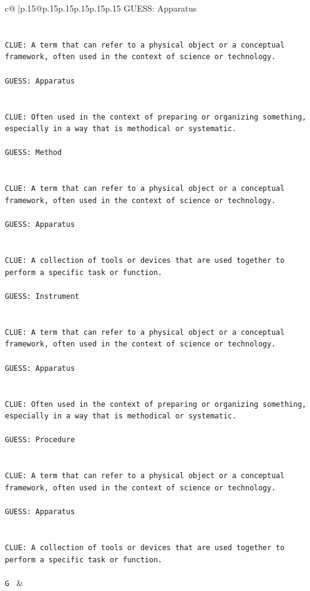 \documentclass{article}
\begin{document}
{\begin{supertabular}{c@{$\;$}|p{.15\linewidth}@{}p{.15\linewidth}p{.15\linewidth}p{.15\linewidth}p{.15\linewidth}p{.15\linewidth}}
{{{	 GUESS: Apparatus\\ \tt \\ \tt \\ \tt CLUE: A term that can refer to a physical object or a conceptual framework, often used in the context of science or technology.\\ \tt \\ \tt GUESS: Apparatus\\ \tt \\ \tt \\ \tt CLUE: Often used in the context of preparing or organizing something, especially in a way that is methodical or systematic.\\ \tt \\ \tt GUESS: Method\\ \tt \\ \tt \\ \tt CLUE: A term that can refer to a physical object or a conceptual framework, often used in the context of science or technology.\\ \tt \\ \tt GUESS: Apparatus\\ \tt \\ \tt \\ \tt CLUE: A collection of tools or devices that are used together to perform a specific task or function.\\ \tt \\ \tt GUESS: Instrument\\ \tt \\ \tt \\ \tt CLUE: A term that can refer to a physical object or a conceptual framework, often used in the context of science or technology.\\ \tt \\ \tt GUESS: Apparatus\\ \tt \\ \tt \\ \tt CLUE: Often used in the context of preparing or organizing something, especially in a way that is methodical or systematic.\\ \tt \\ \tt GUESS: Procedure\\ \tt \\ \tt \\ \tt CLUE: A term that can refer to a physical object or a conceptual framework, often used in the context of science or technology.\\ \tt \\ \tt GUESS: Apparatus\\ \tt \\ \tt \\ \tt CLUE: A collection of tools or devices that are used together to perform a specific task or function.\\ \tt \\ \tt G 
	  } 
	   } 
	   } 
	 & \\ 
 


\end{supertabular}}
\end{document}
